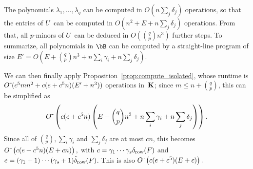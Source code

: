 \documentclass[12pt]{article}
\begin{document}
The polynomials $\lambda_1,\dots,\lambda_q$ can be computed in $O(n \sum_j
\delta_j)$ operations, so that the entries of ${U}$ can be computed in
$O(n^2 + E + n \sum_j \delta_j)$ operations. From that, all $p$-minors
of ${U}$ can be deduced in $O({q \choose p} n^3)$ further steps.
To summarize, all polynomials in $\bB$ can be computed by a straight-line
program of size
$E'=O(E + {q \choose p} n^3 +n \sum_i \gamma_i + n \sum_j \delta_j)$.

\medskip

We can then finally apply Proposition~\ref{prop:compute_isolated},
whose runtime is ${O}{\,\tilde{ }\,}(c^5 m n^2 + c(e+c^5 n)(E' + n^3))$ operations
in~$\mathbf{K}$; since $m \le n + {q \choose p}$, this can be simplified as
$${O}{\,\tilde{ }\,}\left (c(e+c^5 n)\left(E + {q \choose p} n^3 +n \sum_i
\gamma_i + n \sum_j \delta_j\right)\right).$$ Since all of $ {q
  \choose p}, \sum_i \gamma_i$ and $\sum_j \delta_j$ are at most $cn$, this becomes ${O}{\,\tilde{ }\,}\left (c(e+c^5 n)(E + cn)\right),$
with $c=\gamma_1\cdots\gamma_s \delta_{\rm row}({F})$ and
$e=(\gamma_1+1)\cdots(\gamma_s+1) \tilde\delta_{\rm row}({F})$.
This is also  ${O}{\,\tilde{ }\,}\left (c(e+c^5 )(E + c)\right).$
\end{document}
